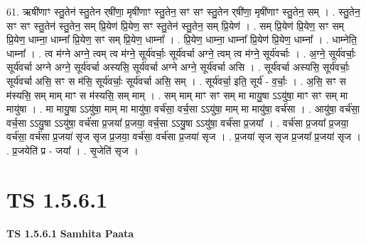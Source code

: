 \documentclass[17pt]{extarticle}
\begin{document}
61. ऋषी॑णाꣳ स्तु॒तेन॑ स्तु॒तेन र्‌षी॑णा॒ मृषी॑णाꣳ स्तु॒तेन॒ सꣳ सꣳ स्तु॒तेन र्‌षी॑णा॒ मृषी॑णाꣳ स्तु॒तेन॒ सम् । . स्तु॒तेन॒ सꣳ सꣳ स्तु॒तेन॑ स्तु॒तेन॒ सम् प्रि॒येण॑ प्रि॒येण॒ सꣳ स्तु॒तेन॑ स्तु॒तेन॒ सम् प्रि॒येण॑ । . सम् प्रि॒येण॑ प्रि॒येण॒ सꣳ सम् प्रि॒येण॒ धाम्ना॒ धाम्ना᳚ प्रि॒येण॒ सꣳ सम् प्रि॒येण॒ धाम्ना᳚ । . प्रि॒येण॒ धाम्ना॒ धाम्ना᳚ प्रि॒येण॑ प्रि॒येण॒ धाम्ना᳚ । . धाम्नेति॒ धाम्ना᳚ । . त्व म॑ग्ने अग्ने॒ त्वम् त्व म॑ग्ने॒ सूर्य॑वर्चाः॒ सूर्य॑वर्चा अग्ने॒ त्वम् त्व म॑ग्ने॒ सूर्य॑वर्चाः । . अ॒ग्ने॒ सूर्य॑वर्चाः॒ सूर्य॑वर्चा अग्ने अग्ने॒ सूर्य॑वर्चा अस्यसि॒ सूर्य॑वर्चा अग्ने अग्ने॒ सूर्य॑वर्चा असि । . सूर्य॑वर्चा अस्यसि॒ सूर्य॑वर्चाः॒ सूर्य॑वर्चा असि॒ सꣳ स म॑सि॒ सूर्य॑वर्चाः॒ सूर्य॑वर्चा असि॒ सम् । . सूर्य॑वर्चा॒ इति॒ सूर्य॑ - व॒र्चाः॒ । . अ॒सि॒ सꣳ स म॑स्यसि॒ सम् माम् माꣳ स म॑स्यसि॒ सम् माम् । . सम् माम् माꣳ सꣳ सम् मा मायु॒षा ऽऽयु॑षा॒ माꣳ सꣳ सम् मा मायु॑षा । . मा मायु॒षा ऽऽयु॑षा॒ माम् मा मायु॑षा॒ वर्च॑सा॒ वर्च॒सा ऽऽयु॑षा॒ माम् मा मायु॑षा॒ वर्च॑सा । . आयु॑षा॒ वर्च॑सा॒ वर्च॒सा ऽऽयु॒षा ऽऽयु॑षा॒ वर्च॑सा प्र॒जया᳚ प्र॒जया॒ वर्च॒सा ऽऽयु॒षा ऽऽयु॑षा॒ वर्च॑सा प्र॒जया᳚ । . वर्च॑सा प्र॒जया᳚ प्र॒जया॒ वर्च॑सा॒ वर्च॑सा प्र॒जया॑ सृज सृज प्र॒जया॒ वर्च॑सा॒ वर्च॑सा प्र॒जया॑ सृज । . प्र॒जया॑ सृज सृज प्र॒जया᳚ प्र॒जया॑ सृज । . प्र॒जयेति॑ प्र - जया᳚ । . सृ॒जेति॑ सृज । \newline
\pagebreak
{}
\section*{ TS 1.5.6.1 }

\textbf{TS 1.5.6.1 } \newline
\textbf{Samhita Paata} \newline
\end{document}
